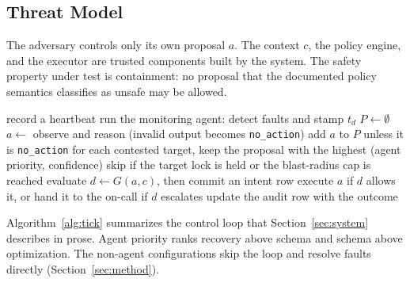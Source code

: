 \subsection{Threat Model}
The adversary controls only its own proposal $a$. The context $c$, the policy engine, and the executor
are trusted components built by the system. The safety property under test is containment: no
proposal that the documented policy semantics classifies as unsafe may be allowed.

\begin{algorithm}[t]
\caption{One control tick.}
\label{alg:tick}
\begin{algorithmic}[1]
\STATE record a heartbeat
 \RETURN \ENDIF
\STATE run the monitoring agent: detect faults and stamp $t_d$
  \STATE $P \leftarrow \emptyset$
    \STATE $a \leftarrow$ observe and reason (invalid output becomes \texttt{no\_action})
    \STATE add $a$ to $P$ unless it is \texttt{no\_action}
  \ENDFOR
  \STATE for each contested target, keep the proposal with the highest (agent priority, confidence)
    \STATE skip if the target lock is held or the blast-radius cap is reached
    \STATE evaluate $d \leftarrow G(a,c)$, then commit an intent row
    \STATE execute $a$ if $d$ allows it, or hand it to the on-call if $d$ escalates
    \STATE update the audit row with the outcome
  \ENDFOR
\ENDIF
\end{algorithmic}
\end{algorithm}

Algorithm~\ref{alg:tick} summarizes the control loop that Section~\ref{sec:system} describes in
prose. Agent priority ranks recovery above schema and schema above optimization. The non-agent
configurations skip the loop and resolve faults directly (Section~\ref{sec:method}).
